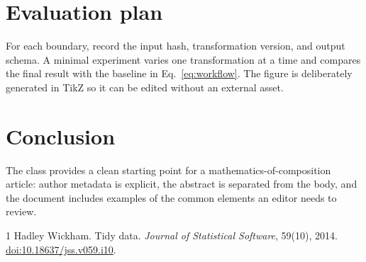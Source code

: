 \documentclass[a4paper,onecolumn,10pt,allowtoday]{compositionalityarticle}
\begin{document}
\section{Evaluation plan}
For each boundary, record the input hash, transformation version, and output
schema. A minimal experiment varies one transformation at a time and compares
the final result with the baseline in Eq.~\eqref{eq:workflow}. The figure is
deliberately generated in TikZ so it can be edited without an external asset.

\section{Conclusion}
The class provides a clean starting point for a mathematics-of-composition
article: author metadata is explicit, the abstract is separated from the body,
and the document includes examples of the common elements an editor needs to
review.

\begin{thebibliography}{1}
Hadley Wickham. Tidy data. \emph{Journal of Statistical Software}, 59(10),
2014. \href{https://doi.org/10.18637/jss.v059.i10}{doi:10.18637/jss.v059.i10}.
\end{thebibliography}
\end{document}
